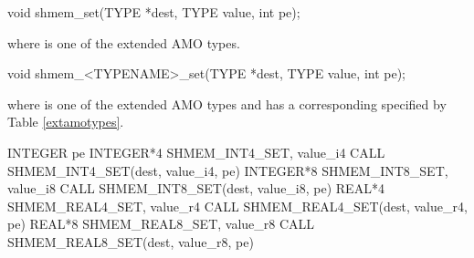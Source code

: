 
\begin{apidefinition}

\begin{C11synopsis}
void shmem_set(TYPE *dest, TYPE value, int pe);
\end{C11synopsis}
where \TYPE{} is one of the extended \ac{AMO} types.

\begin{Csynopsis}
void shmem_<TYPENAME>_set(TYPE *dest, TYPE value, int pe);
\end{Csynopsis}
where \TYPE{} is one of the extended \ac{AMO} types and has a corresponding \TYPENAME{} specified by Table \ref{extamotypes}.

\begin{Fsynopsis}
INTEGER pe
INTEGER*4 SHMEM_INT4_SET, value_i4
CALL SHMEM_INT4_SET(dest, value_i4, pe)
INTEGER*8 SHMEM_INT8_SET, value_i8
CALL SHMEM_INT8_SET(dest, value_i8, pe)
REAL*4 SHMEM_REAL4_SET, value_r4
CALL SHMEM_REAL4_SET(dest, value_r4, pe)
REAL*8 SHMEM_REAL8_SET, value_r8
CALL SHMEM_REAL8_SET(dest, value_r8, pe)
\end{Fsynopsis}

\begin{apiarguments}


\end{apiarguments}




\end{apidefinition}